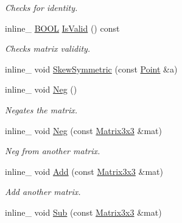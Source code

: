 \begin{DoxyCompactItemize}
\begin{DoxyCompactList}\small\item\em Checks for identity. \end{DoxyCompactList}\item 
\hypertarget{class_matrix3x3_a7a0a18d35e4a9d4f23f3ad1adff7da65}{inline\+\_\+ \hyperlink{_ice_types_8h_a050c65e107f0c828f856a231f4b4e788}{B\+O\+O\+L} \hyperlink{class_matrix3x3_a7a0a18d35e4a9d4f23f3ad1adff7da65}{Is\+Valid} () const }\label{class_matrix3x3_a7a0a18d35e4a9d4f23f3ad1adff7da65}

\begin{DoxyCompactList}\small\item\em Checks matrix validity. \end{DoxyCompactList}\item 
inline\+\_\+ void \hyperlink{class_matrix3x3_ae70311ba318a428a3eb5c6d011a00e9a}{Skew\+Symmetric} (const \hyperlink{class_point}{Point} \&a)
\item 
\hypertarget{class_matrix3x3_a72c353f72929e8c4f703173f76f77b05}{inline\+\_\+ void \hyperlink{class_matrix3x3_a72c353f72929e8c4f703173f76f77b05}{Neg} ()}\label{class_matrix3x3_a72c353f72929e8c4f703173f76f77b05}

\begin{DoxyCompactList}\small\item\em Negates the matrix. \end{DoxyCompactList}\item 
\hypertarget{class_matrix3x3_a2fbcea9e9390924366e7b9e7216c8c0b}{inline\+\_\+ void \hyperlink{class_matrix3x3_a2fbcea9e9390924366e7b9e7216c8c0b}{Neg} (const \hyperlink{class_matrix3x3}{Matrix3x3} \&mat)}\label{class_matrix3x3_a2fbcea9e9390924366e7b9e7216c8c0b}

\begin{DoxyCompactList}\small\item\em Neg from another matrix. \end{DoxyCompactList}\item 
\hypertarget{class_matrix3x3_a2ec5f827890694e7040318034b26a02d}{inline\+\_\+ void \hyperlink{class_matrix3x3_a2ec5f827890694e7040318034b26a02d}{Add} (const \hyperlink{class_matrix3x3}{Matrix3x3} \&mat)}\label{class_matrix3x3_a2ec5f827890694e7040318034b26a02d}

\begin{DoxyCompactList}\small\item\em Add another matrix. \end{DoxyCompactList}\item 
\hypertarget{class_matrix3x3_a068602cc31da1c742896fbf333b5f6c2}{inline\+\_\+ void \hyperlink{class_matrix3x3_a068602cc31da1c742896fbf333b5f6c2}{Sub} (const \hyperlink{class_matrix3x3}{Matrix3x3} \&mat)}\label{class_matrix3x3_a068602cc31da1c742896fbf333b5f6c2}


\end{DoxyCompactItemize}
